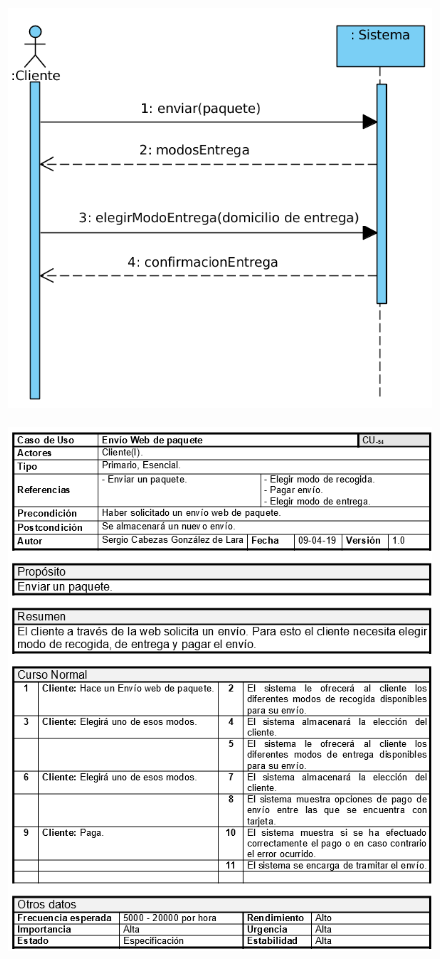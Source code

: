 \begin{figure}[H]
	\centering
	\includegraphics[width=16cm]{49}
\end{figure}
\begin{figure}[H]
	\centering
	\includegraphics[width=16cm]{54}
\end{figure}
